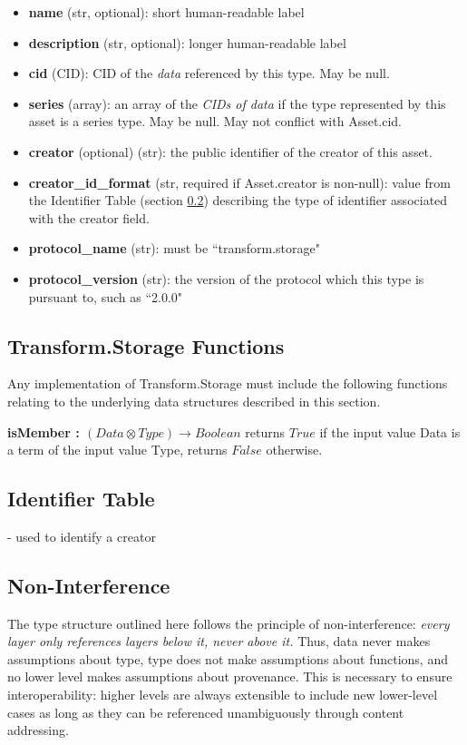 \documentclass[9pt, oneside]{article}   	%
\begin{document}
\begin{multicols}{2}
\begin{itemize}
\item \textbf{name} (str, optional): short human-readable label 
\item \textbf{description} (str, optional): longer human-readable label 
\item \textbf{cid} (CID): CID of the \textit{data} referenced by this type. May be null.
\item \textbf{series} (array): an array of the \textit{CIDs of data} if the type represented by this asset is a series type. May be null. May not conflict with Asset.cid.
\item \textbf{creator} (optional) (str): the public identifier of the creator of this asset.
\item \textbf{creator\_id\_format} (str, required if Asset.creator is non-null): value from the Identifier Table (section \ref{transformID}) describing the type of identifier associated with the creator field.
\item \textbf{protocol\_name} (str): must be ``transform.storage" 
\item \textbf{protocol\_version} (str): the version of the protocol which this type is pursuant to, such as  ``2.0.0"
\end{itemize}

\subsection{Transform.Storage Functions}\label{transformFunc}

Any implementation of Transform.Storage must include the following functions relating to the underlying data structures described in this section.

\textbf{isMember : $(Data \otimes Type) \rightarrow Boolean$} returns $True$ if the input value Data is a term of the input value Type, returns $False$ otherwise.

\subsection{Identifier Table}\label{transformID}
- used to identify a creator

\subsection{Non-Interference}\label{nonInterference}
The type structure outlined here follows the principle of non-interference: \textit{every layer only references layers below it, never above it.} Thus, data never makes assumptions about type, type does not make assumptions about functions, and no lower level makes assumptions about provenance. This is necessary to ensure interoperability: higher levels are always extensible to include new lower-level cases as long as they can be referenced unambiguously through content addressing. 


\end{multicols}
\end{document}
